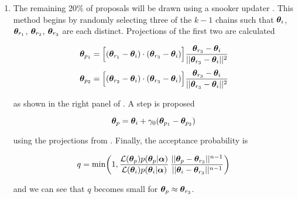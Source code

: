 \begin{enumerate}
\begin{enumerate}
\item \label{itm:update_demc_snooker} The remaining 20\% of proposals will be drawn using a snooker updater
.  This method begins by randomly selecting three of the
$k - 1$ chains such that $\boldsymbol{\theta}_i$, $\boldsymbol{\theta}_{r_1}$,
$\boldsymbol{\theta}_{r_2}$, $\boldsymbol{\theta}_{r_3}$ are each distinct.  Projections of the first two are calculated

\begin{subequations}
\begin{align}
\boldsymbol{\theta}_{p_1} = \Big[ (\boldsymbol{\theta}_{r_1} - \boldsymbol{\theta}_i) \cdot
(\boldsymbol{\theta}_{r_3} - \boldsymbol{\theta}_i) \Big]
\frac{\boldsymbol{\theta}_{r_3} - \boldsymbol{\theta}_i}{||\boldsymbol{\theta}_{r_3} - \boldsymbol{\theta}_i||^2}
\label{eq:elifetime_fit_mcmc_de_snooker_proj1}
\\[3pt]
\boldsymbol{\theta}_{p_2} = \Big[ (\boldsymbol{\theta}_{r_2} - \boldsymbol{\theta}_i) \cdot
(\boldsymbol{\theta}_{r_3} - \boldsymbol{\theta}_i) \Big]
\frac{\boldsymbol{\theta}_{r_3} - \boldsymbol{\theta}_i}{||\boldsymbol{\theta}_{r_3} - \boldsymbol{\theta}_i||^2}
\label{eq:elifetime_fit_mcmc_de_snooker_proj2}
\end{align}
\label{eq:elifetime_fit_mcmc_de_snooker_projs}
\end{subequations}

\noindent as shown in the right panel of .  A step is proposed

\begin{equation}
\boldsymbol{\theta}_p = \boldsymbol{\theta}_i + \gamma_0 (\boldsymbol{\theta}_{p_1} - \boldsymbol{\theta}_{p_2})
\label{eq:elifetime_fit_mcmc_update_snooker}
\end{equation}

\noindent using the projections from .  Finally, the acceptance probability is

\begin{equation}
q = \mathrm{min} \bigg( 1, \frac{\mathcal{L}(\boldsymbol{\theta}_p) p(\boldsymbol{\theta}_p|\boldsymbol{\alpha})}
{\mathcal{L}(\boldsymbol{\theta}_i) p(\boldsymbol{\theta}_i|\boldsymbol{\alpha})}
\, \frac{||\boldsymbol{\theta}_p - \boldsymbol{\theta}_{r_3}||^{n - 1}} {||\boldsymbol{\theta}_i - \boldsymbol{\theta}_{r_3}||^{n - 1}} \bigg)
\label{eq:elifetime_fit_mcmc_demc_snook_acc_prob}
\end{equation}

\noindent and we can see that $q$ becomes small for $\boldsymbol{\theta}_p \approx \boldsymbol{\theta}_{r_3}$.
\end{enumerate}


\end{enumerate}
